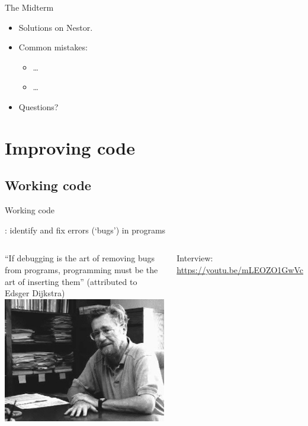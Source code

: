 \documentclass[aspectratio=169,usenames,dvipsnames]{beamer}
\begin{document}
\begin{frame}{The Midterm}
    \begin{itemize}
        \item Solutions on Nestor.
        \item Common mistakes:
            \begin{itemize}
                \item \dots
                \item \dots
            \end{itemize}
        \item Questions?
    \end{itemize}
\end{frame}

\section{Improving code}
\subsection{Working code}
\frame{\tableofcontents[currentsection]}
\begin{frame}{Working code}
    \begin{definition}
        : identify and fix errors (`bugs') in programs
    \end{definition}

    \pause\vspace{1em}
    \begin{columns}
            ``If debugging is the art of removing bugs from programs,
            programming must be the art of inserting them''
            (attributed to Edsger Dijkstra)
            \includegraphics[height=0.5\textheight]{fig/dijkstra}

            \vspace{1em}
            Interview: \url{https://youtu.be/mLEOZO1GwVc}
    \end{columns}
\end{frame}
\end{document}
